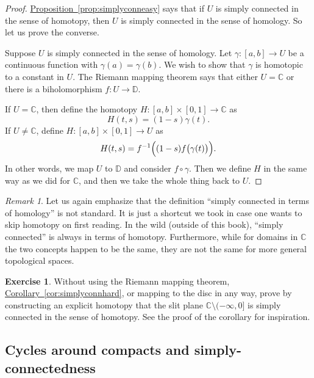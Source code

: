 \documentclass[12pt,openany]{book}
\newcommand{\C}{{\mathbb{C}}}
\newcommand{\D}{{\mathbb{D}}}
\newcommand{\myquote}[1]{``#1''}
\theoremstyle{plain}
\theoremstyle{remark}
\newtheorem{remark}[thm]{Remark}
\theoremstyle{definition}
\newenvironment{exbox}{%
    \def\FrameCommand{\vrule width 1pt \relax\hspace{10pt}}%
    \MakeFramed{\advance\hsize-\width\FrameRestore}%
}{%
    \endMakeFramed
}
\theoremstyle{exercise}
\newtheorem{exercise}{Exercise}[section]
\theoremstyle{example}
\newcommand{\propref}[1]{\hyperref[#1]{Proposition~\ref*{#1}}}
\newcommand{\corref}[1]{\hyperref[#1]{Corollary~\ref*{#1}}}
\begin{document}
\begin{proof}
\propref{prop:simplyconneasy} says that if $U$ is
simply connected in the sense of homotopy, then $U$ is simply connected
in the sense of homology.  So let us prove the converse.

Suppose $U$ is simply connected in
the sense of homology.
Let $\gamma \colon [a,b] \to U$ be a continuous function with
$\gamma(a)=\gamma(b)$.  We wish to show that $\gamma$ is homotopic to a
constant in $U$.
The Riemann mapping theorem says that either $U =
\C$ or there is a biholomorphism $f \colon U \to \D$.

If $U = \C$, then define the homotopy $H \colon [a,b] \times [0,1] \to
\C$ as
\begin{equation*}
H(t,s) = (1-s) \gamma(t) .
\end{equation*}
If $U \neq \C$, define $H \colon [a,b] \times [0,1] \to U$ as
\begin{equation*}
H(t,s) = f^{-1} \Bigl( (1-s) f \bigl( \gamma(t) \bigr) \Bigr) .
\end{equation*}
In other words, we map $U$ to $\D$ and consider $f \circ \gamma$.
Then we define $H$ in the same way as we did for $\C$, and then we
take the whole thing back to $U$.
\end{proof}

\begin{remark}
Let us again emphasize that the definition
\myquote{simply connected in terms of homology} is not standard.
It is just a shortcut we took in case one wants
to skip homotopy on first reading.  In the wild (outside of this book),
\myquote{simply connected} is
always in terms of homotopy.  Furthermore, while for domains in $\C$ the two
concepts happen to be the same, they are not the same for more
general topological spaces.
\end{remark}

\begin{exbox}
\begin{exercise}
Without using the Riemann mapping theorem, \corref{cor:simplyconnhard},
or mapping to the disc in any way, prove by constructing an explicit homotopy
that the slit plane $\C \setminus (-\infty,0]$ is simply connected in
the sense of homotopy.
See the proof of the corollary for inspiration.
\end{exercise}
\end{exbox}

\subsection{Cycles around compacts and simply-connectedness}\label{subsec:patharoundK}
\end{document}
